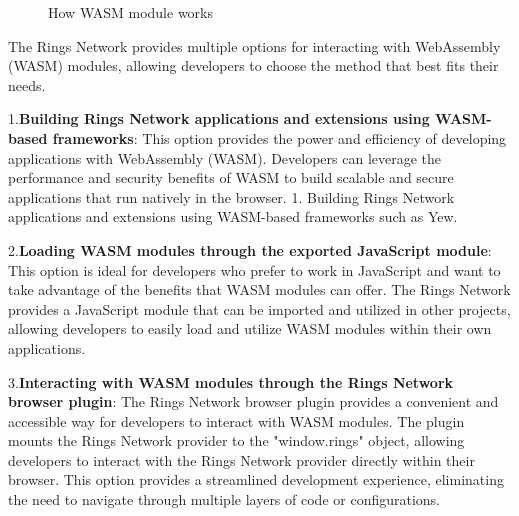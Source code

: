 \documentclass[twocolumn]{article}
\begin{document}
\begin{figure}[htbp]
\caption{How WASM module works}
\end{figure}

The Rings Network provides multiple options for interacting with WebAssembly (WASM) modules, allowing developers to choose the method that best fits their needs.

1.\textbf{Building Rings Network applications and extensions using WASM-based frameworks}: This option provides the power and efficiency of developing applications with WebAssembly (WASM). Developers can leverage the performance and security benefits of WASM to build scalable and secure applications that run natively in the browser.
1. Building Rings Network applications and extensions using WASM-based frameworks such as Yew.

2.\textbf{Loading WASM modules through the exported JavaScript module}: This option is ideal for developers who prefer to work in JavaScript and want to take advantage of the benefits that WASM modules can offer. The Rings Network provides a JavaScript module that can be imported and utilized in other projects, allowing developers to easily load and utilize WASM modules within their own applications.

3.\textbf{Interacting with WASM modules through the Rings Network browser plugin}: The Rings Network browser plugin provides a convenient and accessible way for developers to interact with WASM modules. The plugin mounts the Rings Network provider to the "window.rings" object, allowing developers to interact with the Rings Network provider directly within their browser. This option provides a streamlined development experience, eliminating the need to navigate through multiple layers of code or configurations.
\end{document}
